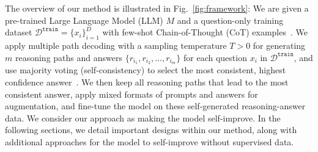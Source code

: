 \documentclass{article} %
\newcommand{\Dcal}{\mathcal{D}}
\begin{document}
The overview of our method is illustrated in Fig.~\ref{fig:framework}:
We are given a pre-trained Large Language Model (LLM) $M$ and a question-only training dataset $\Dcal^{\mathtt{train}}=\{x_i\}_{i=1}^D$ with few-shot Chain-of-Thought (CoT) examples~\citep{Wei2022ChainOT}.
We apply multiple path decoding with a sampling temperature $T>0$ for generating $m$ reasoning paths and answers $\{r_{i_1}, r_{i_2}, \dots, r_{i_m}\}$ for each question $x_i$ in $\Dcal^{ \mathtt{train}}$, and use majority voting (self-consistency) to select the most consistent, highest confidence answer~\citep{Wang2022SelfConsistencyIC}. We then keep all reasoning paths that lead to the most consistent answer,  apply mixed formats of prompts and answers for augmentation, and fine-tune the model on these self-generated reasoning-answer data. We consider our approach as making the model self-improve. %
In the following sections, we detail important designs within our method, along with additional approaches for the model to self-improve without supervised data.

\end{document}
